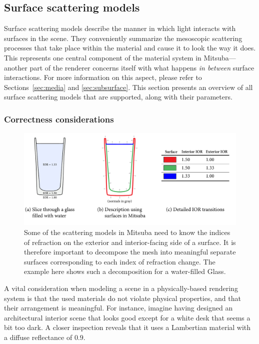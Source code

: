 \subsection{Surface scattering models}
\label{sec:bsdfs}
Surface scattering models describe the manner in which light interacts
with surfaces in the scene. They conveniently summarize the mesoscopic 
scattering processes that take place within the material and 
cause it to look the way it does.
This represents one central component of the material system in Mitsuba---another 
part of the renderer concerns itself with what happens 
\emph{in between} surface interactions. For more information on this aspect, 
please refer to Sections~\ref{sec:media} and \ref{sec:subsurface}.
This section presents an overview of all surface scattering models that are 
supported, along with their parameters.

\subsubsection*{Correctness considerations}
\begin{figure}[b!]
\centering
\vspace{-5mm}
\includegraphics[width=15cm]{images/glass_explanation.pdf}
\vspace{-5mm}
\caption{
	\label{fig:glass-explanation}
	Some of the scattering models in Mitsuba need to know
	the indices of refraction on the exterior and interior-facing
	side of a surface. 
	It is therefore important to decompose the mesh into meaningful
	separate surfaces corresponding to each index of refraction change.
	The example here shows such a decomposition for a water-filled Glass.
}
\end{figure}


A vital consideration when modeling a scene in a physically-based rendering 
system is that the used materials do not violate physical properties, and 
that their arrangement is meaningful. For instance, imagine having designed
an architectural interior scene that looks good except for a white desk that 
seems a bit too dark. A closer inspection reveals that it uses a Lambertian 
material with a diffuse reflectance of $0.9$. 


